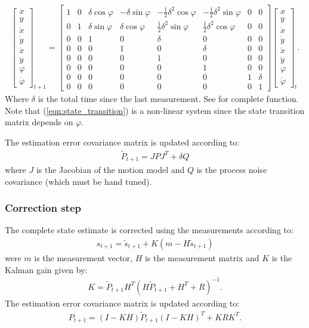 \documentclass[a4paper]{article}
\newcommand \eq[1]{\begin{equation}\begin{aligned}#1 \end{aligned}\end{equation}}
\begin{document}
\eq{
\label{eqn:state_transition}
\begin{bmatrix}
x\\y\\\dot{x}\\\dot{y}\\\ddot{x}\\\ddot{y}\\\varphi\\\dot{\varphi}
\end{bmatrix}_{t+1} = 
\begin{bmatrix}
		1 & 0 & \delta\cos\varphi & -\delta\sin\varphi & -\frac{1}{2}\delta^2\cos\varphi & -\frac{1}{2}\delta^2\sin\varphi & 0 & 0
\\		0 & 1 & \delta\sin\varphi & \delta\cos\varphi & \frac{1}{2}\delta^2\sin\varphi & \frac{1}{2}\delta^2\cos\varphi & 0 & 0
\\ 		0 & 0 & 1 & 0 & \delta & 0 & 0 & 0
\\ 		0 & 0 & 0 & 1 & 0 & \delta & 0 & 0
\\ 		0 & 0 & 0 & 0 & 1 & 0 & 0 & 0
\\ 		0 & 0 & 0 & 0 & 0 & 1 & 0 & 0
\\ 		0 & 0 & 0 & 0 & 0 & 0 & 1 & \delta
\\ 		0 & 0 & 0 & 0 & 0 & 0 & 0 & 1
\end{bmatrix}
\begin{bmatrix}
x\\y\\\dot{x}\\\dot{y}\\\ddot{x}\\\ddot{y}\\\varphi\\\dot{\varphi}
\end{bmatrix}_{t}.
}
Where $\delta$ is the total time since the last measurement. See  for complete function. Note that (\ref{eqn:state_transition}) is a non-linear system since the state transition matrix depends on $\varphi$.
\newline 

\noindent The estimation error covariance matrix is updated according to:
\eq{
	\tilde P_{t+1} = JPJ^T + \delta Q
}
where $J$ is the Jacobian of the motion model and $Q$ is the process noise covariance (which must be hand tuned).

\subsubsection*{Correction step}
The complete state estimate is corrected using the measurements according to:
\eq{
	s_{t+1} = \tilde{s}_{t+1} + K(m - H\tilde{s}_{t+1})
}
were $m$ is the measurement vector, $H$ is the measurement matrix and $K$ is the Kalman gain given by:
\eq{
	K = \tilde P_{t+1}H^T(H\tilde P_{t+1}+H^T+R)^{-1}.
}
The estimation error covariance matrix is updated according to:
\eq{
	P_{t+1} = (I - KH)\tilde P_{t+1}(I-KH)^T + KRK^T.
}
\end{document}
